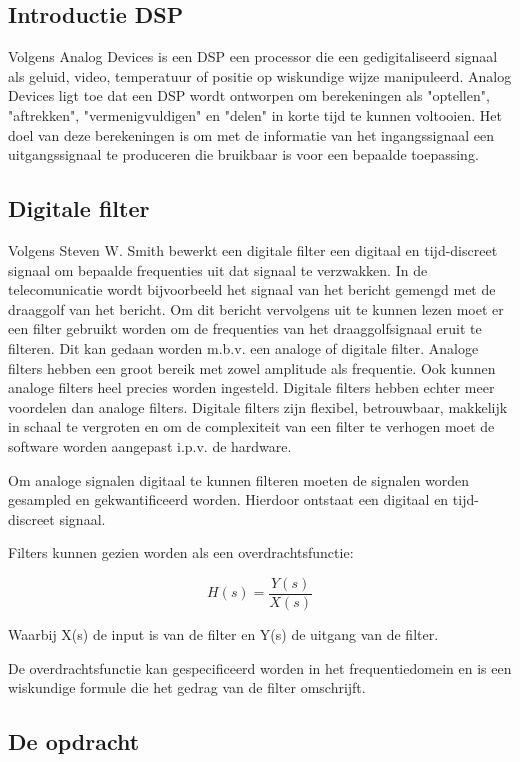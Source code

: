 \documentclass[11pt,a4paper]{article}
\begin{document}
		\subsection{Introductie DSP}
		Volgens Analog Devices \cite{analog} is een DSP een processor die een gedigitaliseerd signaal als geluid, video, temperatuur of positie op wiskundige wijze manipuleerd. Analog Devices ligt toe dat een DSP wordt ontworpen om berekeningen als "optellen", "aftrekken", "vermenigvuldigen" en "delen" in korte tijd te kunnen voltooien. Het doel van deze berekeningen is om met de informatie van het ingangssignaal een uitgangssignaal te produceren die bruikbaar is voor een bepaalde toepassing. 
		
		\subsection{Digitale filter}
		Volgens Steven W. Smith \cite{DSPguide} bewerkt een digitale filter een digitaal en tijd-discreet signaal om bepaalde frequenties uit dat signaal te verzwakken. In de telecomunicatie wordt bijvoorbeeld het signaal van het bericht gemengd met de draaggolf van het bericht. Om dit bericht vervolgens uit te kunnen lezen moet er een filter gebruikt worden om de frequenties van het draaggolfsignaal eruit te filteren. Dit kan gedaan worden m.b.v. een analoge of digitale filter. Analoge filters hebben een groot bereik met zowel amplitude als frequentie. Ook kunnen analoge filters heel precies worden ingesteld. Digitale filters hebben echter meer voordelen dan analoge filters. Digitale filters zijn flexibel, betrouwbaar, makkelijk in schaal te vergroten en om de complexiteit van een filter te verhogen moet de software worden aangepast i.p.v. de hardware. 
		
Om analoge signalen digitaal te kunnen filteren moeten de signalen worden gesampled en gekwantificeerd worden. Hierdoor ontstaat een digitaal en tijd-discreet signaal. 

Filters kunnen gezien worden als een overdrachtsfunctie:
 
\[
    H(s) = \frac{Y(s)}{X(s)}
\]	

Waarbij X(s) de input is van de filter en Y(s) de uitgang van de filter. 

De overdrachtsfunctie kan gespecificeerd worden in het frequentiedomein en is een wiskundige formule die het gedrag van de filter omschrijft.  

		
	\subsection{De opdracht}		
		
\end{document}
